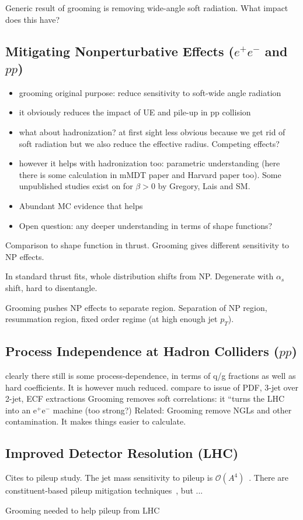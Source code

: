 

Generic result of grooming is removing wide-angle soft radiation.  What impact does this have?

\subsection{Mitigating Nonperturbative Effects ($e^+e^-$ and $pp$)}


\begin{itemize}
\item grooming original purpose: reduce sensitivity to soft-wide angle radiation
\item it obviously reduces the impact of UE and pile-up in pp collision
\item what about hadronization? at first sight less obvious because we get rid of soft radiation but we also reduce the effective radius. Competing effects?
\item however it helps with hadronization too: parametric understanding (here there is some calculation in mMDT paper and Harvard paper too). Some unpublished studies exist on  for $\beta>0$ by Gregory, Lais and SM. 
\item Abundant MC evidence that helps
\item Open question: any deeper understanding in terms of shape functions?
\end{itemize}

Comparison to shape function in thrust.  Grooming gives different sensitivity to NP effects.

In standard thrust fits, whole distribution shifts from NP.  Degenerate with $\alpha_s$ shift, hard to disentangle.

Grooming pushes NP effects to separate region.  Separation of NP region, resummation region, fixed order regime (at high enough jet $p_T$).

\subsection{Process Independence at Hadron Colliders ($pp$)}

clearly there still is some process-dependence, in terms of q/g fractions as well as hard coefficients. It is however much reduced.
compare to issue of PDF, 3-jet over 2-jet, ECF extractions
Grooming removes soft correlations: it ``turns the LHC into an e$^+$e$^-$ machine (too strong?)
Related:  Grooming remove NGLs and other contamination. It makes things easier to calculate. 


\subsection{Improved Detector Resolution (LHC)}

Cites to pileup study. The jet mass sensitivity to pileup is $\mathcal{O}(A^4)$~\cite{Salam:2009jx}.  There are constituent-based pileup mitigation techniques~\cite{Cacciari:2014gra,Krohn:2013lba,Bertolini:2014bba,Berta:2014eza,Komiske:2017ubm}, but ...

Grooming needed to help pileup from LHC
